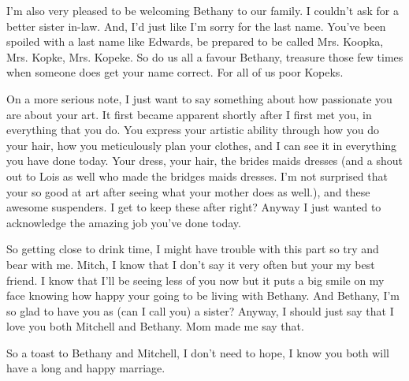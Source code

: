 I'm also very pleased to be welcoming Bethany to our family. I couldn't ask for a better sister in-law. And, I'd just like I'm sorry for the last name. You've been spoiled with a last name like Edwards, be prepared to be called Mrs. Koopka, Mrs. Kopke, Mrs. Kopeke. So do us all a favour Bethany, treasure those few times when someone does get your name correct. For all of us poor Kopeks.

On a more serious note, I just want to say something about how passionate you are about your art. It first became apparent shortly after I first met you, in everything that you do. You express your artistic ability through how you do your hair, how you meticulously plan your clothes, and I can see it in everything you have done today. Your dress, your hair, the brides maids dresses (and a shout out to Lois as well who made the bridges maids dresses. I'm not surprised that your so good at art after seeing what your mother does as well.), and these awesome suspenders. I get to keep these after right? Anyway I just wanted to acknowledge the amazing job you've done today.

So getting close to drink time, I might have trouble with this part so try and bear with me. Mitch, I know that I don't say it very often but your my best friend. I know that I'll be seeing less of you now but it puts a big smile
on my face knowing how happy your going to be living with Bethany. And Bethany, I'm so glad to have you as (can I call you) a sister? Anyway, I should just say that I love you both Mitchell and Bethany. Mom made me say that.

So a toast to Bethany and Mitchell, I don't need to hope, I know you both will have a long and happy marriage.
